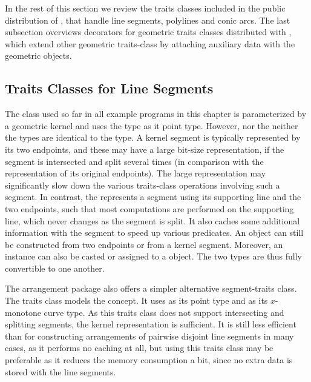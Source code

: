 In the rest of this section we review the traits classes
included in the public distribution of \cgal, that handle line
segments, polylines and conic arcs. The last subsection overviews
decorators for geometric traits classes distributed with \cgal,
which extend other geometric traits-class by attaching auxiliary
data with the geometric objects.

\subsection{Traits Classes for Line Segments}
\label{arr_ssec:tr_segs}
%
The  class used so far
in all example programs in this chapter is parameterized by a
geometric kernel and uses the  type as it
point type. However, nor the  neither the
 types are identical to the
 type. A kernel segment is typically
represented by its two endpoints, and these may have a large bit-size
representation, if the segment is intersected and split several
times (in comparison with the representation of its original
endpoints). The large representation may significantly slow down the
various traits-class operations involving such a segment. In contrast,
the  represents a segment using
its supporting line and the two endpoints, such that most computations
are performed on the supporting line, which never changes as the
segment is split. It also caches some additional information with
the segment to speed up various predicates.
An  object can still be constructed from two
endpoints or from a kernel segment. Moreover, an
 instance can also be casted or assigned to a
 object. The two types are thus fully
convertible to one another.

The arrangement package also offers a simpler alternative
segment-traits class. The traits class
 models 
the  concept. It uses
 as its point type and
 as its $x$-monotone curve type. As this
traits class does not support intersecting and splitting segments,
the kernel representation is sufficient. It is still less
efficient than  for constructing
arrangements of pairwise disjoint line segments in many cases, as
it performs no caching at all, but using this traits class may be
preferable as it reduces the memory consumption a bit, since no extra
data is stored with the line segments.

